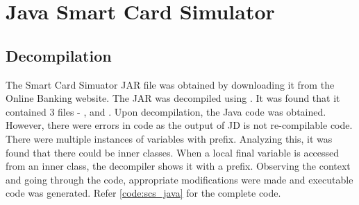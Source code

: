 \section{Java Smart Card Simulator} \label{java_scs_decompilation}

\subsection{Decompilation}
The Smart Card Simuator JAR file was obtained by downloading it from the Online Banking website. The JAR was decompiled using . It was found that it contained 3 files - ,  and . Upon decompilation, the Java code was obtained. However, there were errors in code as the output of JD is not re-compilable code. There were multiple instances of variables with  prefix. Analyzing this, it was found that there could be inner classes. When a local final variable is accessed from an inner class, the decompiler shows it with a  prefix.
Observing the context and going through the code, appropriate modifications were made and executable code was generated. Refer \ref{code:scs_java} for the complete code.

